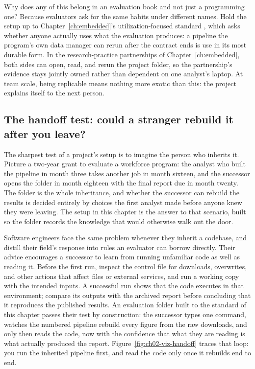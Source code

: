 Why does any of this belong in an evaluation book and not just a programming one? Because evaluators ask for the same habits under different names. Hold the setup up to Chapter~\ref{ch:embedded}'s utilization-focused standard \parencite{patton2008utilization}, which asks whether anyone actually uses what the evaluation produces: a pipeline the program's own data manager can rerun after the contract ends is use in its most durable form. In the research-practice partnerships of Chapter~\ref{ch:embedded}, both sides can open, read, and rerun the project folder, so the partnership's evidence stays jointly owned rather than dependent on one analyst's laptop. At team scale, being replicable means nothing more exotic than this: the project explains itself to the next person.

\subsection{The handoff test: could a stranger rebuild it after you leave?}\label{sec:ch02-handoff}
The sharpest test of a project's setup is to imagine the person who inherits it. Picture a two-year grant to evaluate a workforce program: the analyst who built the pipeline in month three takes another job in month sixteen, and the successor opens the folder in month eighteen with the final report due in month twenty. The folder is the whole inheritance, and whether the successor can rebuild the results is decided entirely by choices the first analyst made before anyone knew they were leaving. The setup in this chapter is the answer to that scenario, built so the folder records the knowledge that would otherwise walk out the door.

Software engineers face the same problem whenever they inherit a codebase, and \textcite{pilgrim2023code} distill their field's response into rules an evaluator can borrow directly. Their advice encourages a successor to learn from running unfamiliar code as well as reading it. Before the first run, inspect the control file for downloads, overwrites, and other actions that affect files or external services, and run a working copy with the intended inputs. A successful run shows that the code executes in that environment; compare its outputs with the archived report before concluding that it reproduces the published results. An evaluation folder built to the standard of this chapter passes their test by construction: the successor types one command, watches the numbered pipeline rebuild every figure from the raw downloads, and only then reads the code, now with the confidence that what they are reading is what actually produced the report. Figure~\ref{fig:ch02-viz-handoff} traces that loop: you run the inherited pipeline first, and read the code only once it rebuilds end to end.


